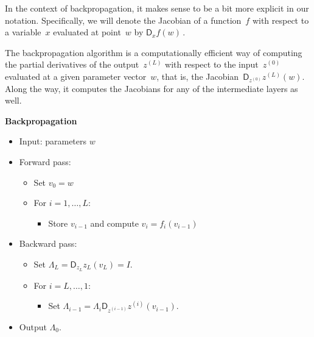 \documentclass{tufte-book}
\begin{document}
In the context of backpropagation, it makes sense to be a bit more
explicit in our notation. Specifically, we will denote the Jacobian of a
function~\(f\) with respect to a variable~\(x\) evaluated at point~\(w\)
by \(\mathsf{D}_x f(w)\,.\)

The backpropagation algorithm is a computationally efficient way of
computing the partial derivatives of the output~\(z^{(L)}\) with respect
to the input~\(z^{(0)}\) evaluated at a given parameter vector~\(w\),
that is, the Jacobian~\(\mathsf{D}_{z^{(0)}} z^{(L)}(w).\) Along the
way, it computes the Jacobians for any of the intermediate layers as
well.

\begin{Algorithm}

\textbf{Backpropagation}

\begin{itemize}
\tightlist
\item
  Input: parameters \(w\)
\item
  Forward pass:

  \begin{itemize}
  \tightlist
  \item
    Set \(v_0 = w\)
  \item
    For \(i =1,\ldots,L\):

    \begin{itemize}
    \tightlist
    \item
      Store \(v_{i-1}\) and compute \(v_i = f_i(v_{i-1})\)
    \end{itemize}
  \end{itemize}
\item
  Backward pass:

  \begin{itemize}
  \tightlist
  \item
    Set \(\Lambda_L = \mathsf{D}_{z_{L}} z_L(v_L)= I\).
  \item
    For \(i=L,\ldots,1\):

    \begin{itemize}
    \tightlist
    \item
      Set
      \(\Lambda_{i-1} =\Lambda_i\mathsf{D}_{z^{(i-1)}} z^{(i)}(v_{i-1})\).
    \end{itemize}
  \end{itemize}
\item
  Output \(\Lambda_0\).
\end{itemize}

\end{Algorithm}
\end{document}
